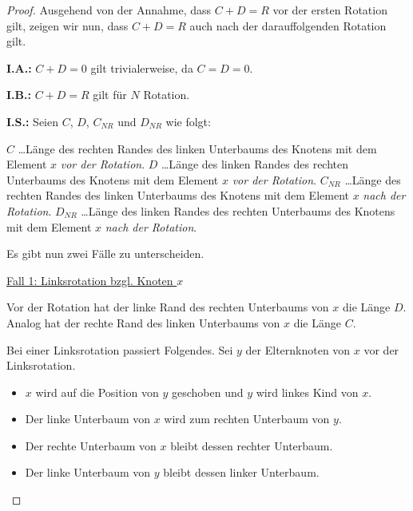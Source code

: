\documentclass{article}
\begin{document}
\begin{proof}
Ausgehend von der Annahme, dass $C + D = R$ vor der ersten Rotation gilt,
zeigen wir nun, dass $C + D = R$ auch nach der darauffolgenden Rotation gilt.

{\bfseries I.A.:} $C + D = 0$ gilt trivialerweise, da $C = D = 0$.

{\bfseries I.B.:} $C + D = R$ gilt f{\"u}r $N$ Rotation.

{\bfseries I.S.:}
Seien $C$, $D$, $C_{NR}$ und $D_{NR}$ wie folgt:

$C$ \ldots L{\"a}nge des rechten Randes des linken Unterbaums des Knotens mit
dem Element $x$ \emph{vor der Rotation}.
\newline
$D$ \ldots L{\"a}nge des linken Randes des rechten Unterbaums des Knotens mit
dem Element $x$ \emph{vor der Rotation}.
\newline
$C_{NR}$ \ldots L{\"a}nge des rechten Randes des linken Unterbaums des Knotens
mit dem Element $x$ \emph{nach der Rotation}.
\newline
$D_{NR}$ \ldots L{\"a}nge des linken Randes des rechten Unterbaums des Knotens
mit dem Element $x$ \emph{nach der Rotation}.

Es gibt nun zwei F{\"a}lle zu unterscheiden.

\underline{Fall 1: Linksrotation bzgl. Knoten $x$}

Vor der Rotation hat der linke Rand des rechten Unterbaums von $x$ die L{\"a}nge
$D$. Analog hat der rechte Rand des linken Unterbaums von $x$ die L{\"a}nge $C$.

Bei einer Linksrotation passiert Folgendes. Sei $y$ der Elternknoten von $x$ vor
der Linksrotation.
{\parskip0pt\begin{itemize}
  \item $x$ wird auf die Position von $y$ geschoben und $y$ wird linkes Kind von
    $x$.
  \item Der linke Unterbaum von $x$ wird zum rechten Unterbaum von $y$.
  \item Der rechte Unterbaum von $x$ bleibt dessen rechter Unterbaum.
  \item Der linke Unterbaum von $y$ bleibt dessen linker Unterbaum.
\end{itemize}}

\begin{figure}[H]
  \centering
\end{figure}
\end{proof}
\end{document}
